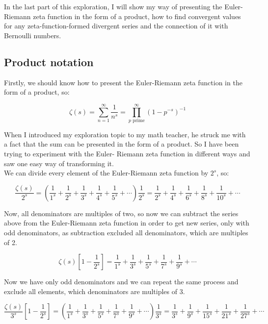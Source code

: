 \documentclass[a4paper]{article}
\begin{document}
In the last part of this exploration, I will show my way of presenting the
Euler-Riemann zeta function in the form of a product, how to find convergent
values for any zeta-function-formed divergent series and the connection of it
with Bernoulli numbers. 

\subsection{Product notation}
\label{sec:orgab8bfb0}

Firstly, we should know how to present the Euler-Riemann zeta function in the
form of a product, so:

\begin{equation}
  \zeta(s)=\sum_{n=1}^{\infty} \frac{1}{n^s}=\prod_{p \text{ prime}}^{\infty} (1-p^{-s})^{-1}
\end{equation}

When I introduced my exploration topic to my math teacher, he struck me with a
fact that the sum can be presented in the form of a product. So I have been
trying to experiment with the Euler- Riemann zeta function in different ways and
saw one easy way of transforming it.\\

We can divide every element of the Euler-Riemann zeta function by \(2^s\), so:

\begin{equation*}
  \frac{\zeta(s)}{2^s}= (\frac{1}{1^s}+\frac{1}{2^s}+\frac{1}{3^s}+
  \frac{1}{4^s}+\frac{1}{5^s}+\cdots)\frac{1}{2^s}=
  \frac{1}{2^s}+\frac{1}{4^s}+\frac{1}{6^s}+
  \frac{1}{8^s}+\frac{1}{10^s}+\cdots
  \end{equation*}

Now, all denominators are multiples of two, so now we can subtract the series
above from the Euler-Riemann zeta function in order to get new series, only with
odd denominators, as subtraction excluded all denominators, which are multiples
of 2. 

\begin{equation*}
  \zeta(s)[1-\frac{1}{2^s}]=\frac{1}{1^s}+\frac{1}{3^s}+\frac{1}{5^s}+
  \frac{1}{7^s}+\frac{1}{9^s}+\cdots
  \end{equation*}

Now we have only odd denominators and we can repeat the same process and exclude
all elements, which denominators are multiples of 3.

\begin{equation*}
  \frac{\zeta(s)}{3^s}[1-\frac{1}{2^s}] = (\frac{1}{1^s}+\frac{1}{3^s}+\frac{1}{5^s}+
  \frac{1}{7^s}+\frac{1}{9^s}+\cdots)\frac{1}{3^s}=\frac{1}{3^s}+\frac{1}{9^s}+\frac{1}{15^s}+
  \frac{1}{21^s}+\frac{1}{27^s}+\cdots
\end{equation*}
\end{document}
